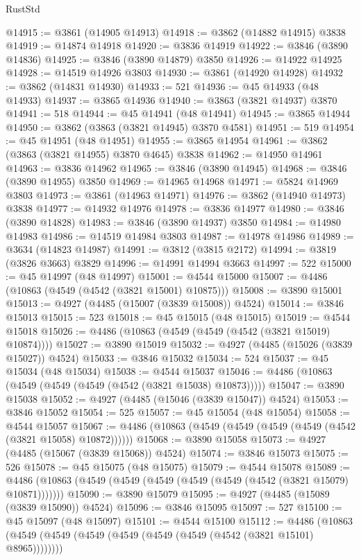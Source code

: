 \begin{lexlean}{RustStd}
\begin{coremodule}
@14915 := @3861 (@14905 @14913)
@14918 := @3862 (@14882 @14915) @3838
@14919 := @14874 @14918
@14920 := @3836 @14919
@14922 := @3846 (@3890 @14836)
@14925 := @3846 (@3890 @14879) @3850
@14926 := @14922 @14925
@14928 := @14519 @14926 @3803
@14930 := @3861 (@14920 @14928)
@14932 := @3862 (@14831 @14930)
@14933 := 521
@14936 := @45 @14933 (@48 @14933)
@14937 := @3865 @14936
@14940 := @3863 (@3821 @14937) @3870
@14941 := 518
@14944 := @45 @14941 (@48 @14941)
@14945 := @3865 @14944
@14950 := @3862 (@3863 (@3821 @14945) @3870 @4581)
@14951 := 519
@14954 := @45 @14951 (@48 @14951)
@14955 := @3865 @14954
@14961 := @3862 (@3863 (@3821 @14955) @3870 @4645) @3838
@14962 := @14950 @14961
@14963 := @3836 @14962
@14965 := @3846 (@3890 @14945)
@14968 := @3846 (@3890 @14955) @3850
@14969 := @14965 @14968
@14971 := @5824 @14969 @3803
@14973 := @3861 (@14963 @14971)
@14976 := @3862 (@14940 @14973) @3838
@14977 := @14932 @14976
@14978 := @3836 @14977
@14980 := @3846 (@3890 @14828)
@14983 := @3846 (@3890 @14937) @3850
@14984 := @14980 @14983
@14986 := @14519 @14984 @3803
@14987 := @14978 @14986
@14989 := @3634 (@14823 @14987)
@14991 := @3812 (@3815 @2172)
@14994 := @3819 (@3826 @3663) @3829
@14996 := @14991 @14994 @3663
@14997 := 522
@15000 := @45 @14997 (@48 @14997)
@15001 := @4544 @15000
@15007 := @4486 (@10863 (@4549 (@4542 (@3821 @15001) @10875)))
@15008 := @3890 @15001
@15013 := @4927 (@4485 (@15007 (@3839 @15008)) @4524)
@15014 := @3846 @15013
@15015 := 523
@15018 := @45 @15015 (@48 @15015)
@15019 := @4544 @15018
@15026 := @4486 (@10863 (@4549 (@4549 (@4542 (@3821 @15019) @10874))))
@15027 := @3890 @15019
@15032 := @4927 (@4485 (@15026 (@3839 @15027)) @4524)
@15033 := @3846 @15032
@15034 := 524
@15037 := @45 @15034 (@48 @15034)
@15038 := @4544 @15037
@15046 := @4486 (@10863 (@4549 (@4549 (@4549 (@4542 (@3821 @15038) @10873)))))
@15047 := @3890 @15038
@15052 := @4927 (@4485 (@15046 (@3839 @15047)) @4524)
@15053 := @3846 @15052
@15054 := 525
@15057 := @45 @15054 (@48 @15054)
@15058 := @4544 @15057
@15067 := @4486 (@10863 (@4549 (@4549 (@4549 (@4549 (@4542 (@3821 @15058) @10872))))))
@15068 := @3890 @15058
@15073 := @4927 (@4485 (@15067 (@3839 @15068)) @4524)
@15074 := @3846 @15073
@15075 := 526
@15078 := @45 @15075 (@48 @15075)
@15079 := @4544 @15078
@15089 := @4486 (@10863 (@4549 (@4549 (@4549 (@4549 (@4549 (@4542 (@3821 @15079) @10871)))))))
@15090 := @3890 @15079
@15095 := @4927 (@4485 (@15089 (@3839 @15090)) @4524)
@15096 := @3846 @15095
@15097 := 527
@15100 := @45 @15097 (@48 @15097)
@15101 := @4544 @15100
@15112 := @4486
    (@10863 (@4549 (@4549 (@4549 (@4549 (@4549 (@4549 (@4542 (@3821 @15101) @8965))))))))

\end{coremodule}
\end{lexlean}
